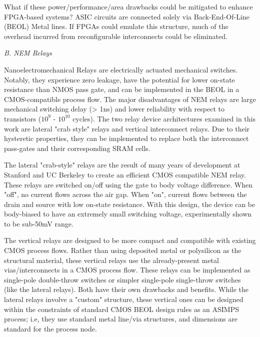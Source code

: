 \documentclass[twoside,twocolumn]{article}
\begin{document}
What if these power/performance/area drawbacks could be mitigated to enhance FPGA-based systems? ASIC circuits are connected solely via Back-End-Of-Line (BEOL) Metal lines. If FPGAs could emulate this structure, much of the overhead incurred from reconfigurable interconnects could be eliminated.

\textit{B. NEM Relays}

Nanoelectromechanical Relays are electrically actuated mechanical switches. Notably, they experience zero leakage, have the potential for lower on-state resistance than NMOS pass gate, and can be implemented in the BEOL in a CMOS-compatible process flow\cite{LIU}. The major disadvantages of NEM relays are large mechanical switching delay (> 1ns)\cite{chen_integrated_2008} and lower reliability with respect to transistors ($10^9$ - $10^{10}$ cycles). The two relay device architectures examined in this work are lateral "crab style" relays and vertical interconnect relays. Due to their hysteretic properties, they can be implemented to replace both the interconnect pass-gates and their corresponding SRAM cells.

The lateral "crab-style" relays are the result of many years of development at Stanford and UC Berkeley to create an efficient CMOS compatible NEM relay\cite{LIU}. These relays are switched on/off using the gate to body voltage difference. When "off", no current flows across the air gap. When "on", current flows between the drain and source with low on-state resistance. With this design, the device can be body-biased to have an extremely small switching voltage, experimentally shown to be sub-50mV range.

The vertical relays are designed to be more compact and compatible with existing CMOS process flows. Rather than using deposited metal or polysilicon as the structural material, these vertical relays use the already-present metal vias/interconnects in a CMOS process flow\cite{SIKDER}. These relays can be implemented as single-pole double-throw switches or simpler single-pole single-throw switches \cite{OLDSIKDER} (like the lateral relays). Both have their own drawbacks and benefits. While the lateral relays involve a "custom" structure, these vertical ones can be designed within the constraints of standard CMOS BEOL design rules as an ASIMPS process; i.e, they use standard metal line/via structures, and dimensions are standard for the process node.

\end{document}
